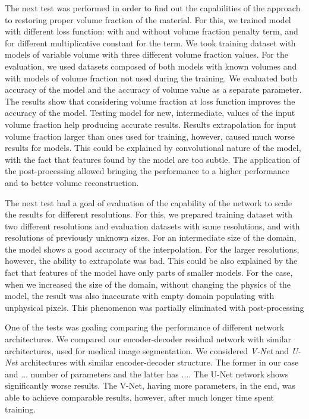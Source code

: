 The next test was performed in order to find out the capabilities of the approach to restoring proper volume fraction of the material. 
For this, we trained model with different loss function: with and without volume fraction penalty term, and for different multiplicative constant for the term.
We took training dataset with models of variable volume with three different volume fraction values.
For the evaluation, we used datasets composed of both models with known volumes and with models of volume fraction not used during the training.
We evaluated both accuracy of the model and the accuracy of volume value as a separate parameter.
The results show that considering volume fraction at loss function improves the accuracy of the model. 
Testing model for new, intermediate, values of the input volume fraction help producing accurate results.
Results extrapolation for input volume fraction larger than ones used for training, however, caused much worse results for models. 
This could be explained by convolutional nature of the model, with the fact that features found by the model are too subtle.  
The application of the post-processing allowed bringing the performance to a higher performance and to better volume reconstruction. 
\medskip 

The next test had a goal of evaluation of the capability of the network to scale the results for different resolutions.
For this, we prepared training dataset with two different resolutions and evaluation datasets with same resolutions, and with resolutions of previously unknown sizes.
For an intermediate size of the domain, the model shows a good accuracy of the interpolation.
For the larger resolutions, however, the ability to extrapolate was bad.
This could be also explained by the fact that features of the model have only parts of smaller models.
For the case, when we increased the size of the domain, without changing the physics of the model, the result was also inaccurate with empty domain populating with unphysical pixels.
This phenomenon was partially eliminated with post-processing
\medskip

One of the tests was goaling comparing the performance of different network architectures.
We compared our encoder-decoder residual network with similar architectures, used for medical image segmentation.
We considered \emph{V-Net}\cite{} and \emph{U-Net}\cite{} architectures with similar encoder-decoder structure.
The former in our case and $...$ number of parameters and the latter has $...$.
The U-Net network shows significantly worse results.
The V-Net, having more parameters, in the end, was able to achieve comparable results, however, after much longer time spent training.
\medskip

